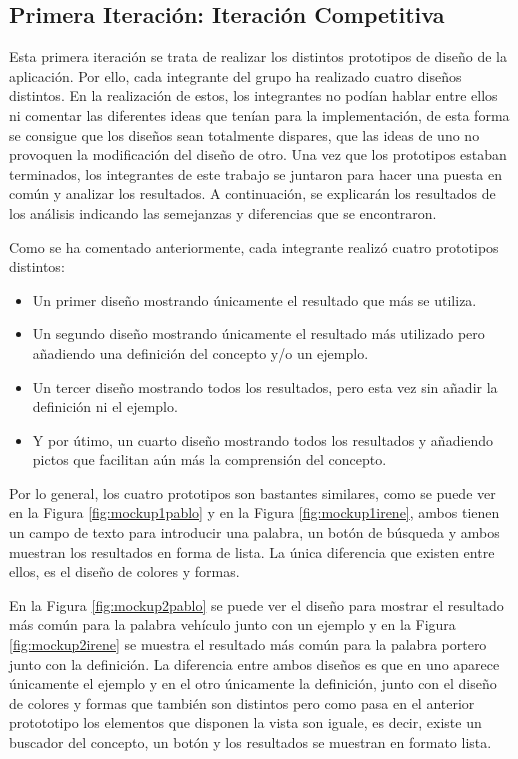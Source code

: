 \subsection{Primera Iteración: Iteración Competitiva}
\label{cap:subsec:iteracionCompetitiva}

Esta primera iteración se trata de realizar los distintos prototipos de diseño de la aplicación. Por ello, cada integrante del grupo ha realizado cuatro diseños distintos. En la realización de estos, los integrantes no podían hablar entre ellos ni comentar las diferentes ideas que tenían para la implementación, de esta forma se consigue que los diseños sean totalmente dispares, que las ideas de uno no provoquen la modificación del diseño de otro.
Una vez que los prototipos estaban terminados, los integrantes de este trabajo se juntaron para hacer una puesta en común y analizar los resultados. A continuación, se explicarán los resultados de los análisis indicando las semejanzas y diferencias que se encontraron.

Como se ha comentado anteriormente, cada integrante realizó cuatro prototipos distintos:
\begin{itemize}
	\item Un primer diseño mostrando únicamente el resultado que más se utiliza.
	\item Un segundo diseño mostrando únicamente el resultado más utilizado pero añadiendo una definición del concepto y/o un ejemplo.
	\item Un tercer diseño mostrando todos los resultados, pero esta vez sin añadir la definición ni el ejemplo.
	\item Y por útimo, un cuarto diseño mostrando todos los resultados y añadiendo pictos que facilitan aún más la comprensión del concepto.
	
\end{itemize}

Por lo general, los cuatro prototipos son bastantes similares, como se puede ver en la Figura \ref{fig:mockup1pablo} y en la Figura \ref{fig:mockup1irene}, ambos tienen un campo de texto para introducir una palabra, un botón de búsqueda y ambos muestran los resultados en forma de lista. La única diferencia que existen entre ellos, es el diseño de colores y formas.

En la Figura \ref{fig:mockup2pablo} se puede ver el diseño para mostrar el resultado más común para la palabra vehículo junto con un ejemplo y en la Figura \ref{fig:mockup2irene} se muestra el resultado más común para la palabra portero junto con la definición. La diferencia entre ambos diseños es que en uno aparece únicamente el ejemplo y en el otro únicamente la definición, junto con el diseño de colores y formas que también son distintos pero como pasa en el anterior protototipo los elementos que disponen la vista son iguale, es decir, existe un buscador del concepto, un botón y los resultados se muestran en formato lista.

